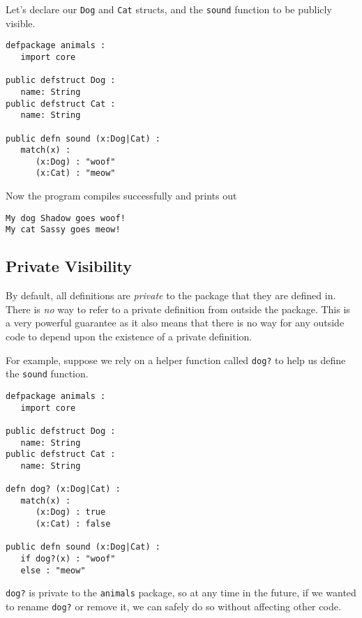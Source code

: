 \documentclass[10pt,oneside]{book}
\begin{document}
Let's declare our \texttt{\frenchspacing Dog} and \texttt{\frenchspacing Cat} structs, and the \texttt{\frenchspacing sound} function to be publicly visible.
\begin{lstlisting}
defpackage animals :
   import core

public defstruct Dog :
   name: String
public defstruct Cat :
   name: String

public defn sound (x:Dog|Cat) :
   match(x) :
      (x:Dog) : "woof"
      (x:Cat) : "meow"
\end{lstlisting}

Now the program compiles successfully and prints out
\begin{lstlisting}
My dog Shadow goes woof!
My cat Sassy goes meow!
\end{lstlisting}

\subsection*{Private Visibility}
By default, all definitions are {\em private} to the package that they are defined in. There is {\em no} way to refer to a private definition from outside the package. This is a very powerful guarantee as it also means that there is no way for any outside code to depend upon the existence of a private definition. 

For example, suppose we rely on a helper function called \texttt{\frenchspacing dog?} to help us define the \texttt{\frenchspacing sound} function. 
\begin{lstlisting}
defpackage animals :
   import core

public defstruct Dog :
   name: String
public defstruct Cat :
   name: String

defn dog? (x:Dog|Cat) :
   match(x) :
      (x:Dog) : true
      (x:Cat) : false

public defn sound (x:Dog|Cat) :
   if dog?(x) : "woof"
   else : "meow"
\end{lstlisting}
\texttt{\frenchspacing dog?} is private to the \texttt{\frenchspacing animals} package, so at any time in the future, if we wanted to rename \texttt{\frenchspacing dog?} or remove it, we can safely do so without affecting other code.
\end{document}
